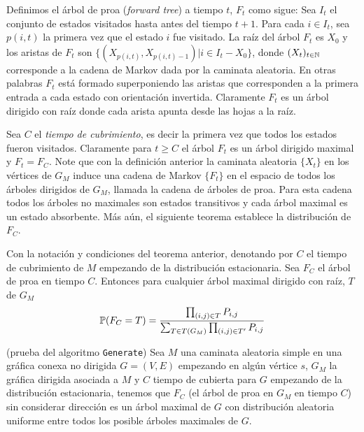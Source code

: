 Definimos el árbol de proa (\textit{forward tree}) a tiempo $t$, $F_{t}$ como sigue: Sea $I_{t}$ el conjunto de estados visitados hasta antes del tiempo $t+1$. Para cada $i\in I_{t}$, sea $p(i,t)$ la primera vez que el estado $i$ fue visitado. La raíz del árbol $F_{t}$ es $X_{0}$ y los aristas de $F_{t}$ son $\{(X_{p(i,t)},X_{p(i,t)-1}) | i\in I_{t}-X_{0}\}$, donde $(X_{t})_{t\in \N}$ corresponde a la cadena de Markov dada por la caminata aleatoria. En otras palabras $F_{t}$ está formado superponiendo las aristas que corresponden a la primera entrada a cada estado con orientación invertida. Claramente $F_{t}$ es un árbol dirigido con raíz donde cada arista apunta desde las hojas a la raíz.

Sea $C$ el \textit{tiempo de cubrimiento}, es decir la primera vez que todos los estados fueron visitados. Claramente para $t\geq C$ el árbol $F_{t}$ es un árbol dirigido maximal y $F_{t}=F_{C}$. Note que con la definición anterior la caminata aleatoria $\{X_{t}\}$ en los vértices de $G_{M}$ induce una cadena de Markov $\{F_{t}\}$ en el espacio de todos los árboles dirigidos de $G_{M}$, llamada la cadena de árboles de proa. Para esta cadena todos los árboles no maximales son estados transitivos y cada árbol maximal es un estado absorbente. Más aún, el siguiente teorema establece la distribución de $F_{C}$.

\begin{theorem}
Con la notación y condiciones del teorema anterior, denotando por $C$ el tiempo de cubrimiento de $M$ empezando de la distribución estacionaria. Sea $F_{C}$ el árbol de proa en tiempo $C$. Entonces para cualquier árbol maximal dirigido con raíz, $T$ de $G_{M}$
$$\P(F_{C} = T) = \frac{\prod_{(i,j)\in T} P_{i,j}}{\sum_{T\in T(G_{M})} \prod_{(i,j)\in T'} P_{i,j}}$$
\end{theorem}

\begin{coro}
(prueba del algoritmo \texttt{Generate}) Sea $M$ una caminata aleatoria simple en una gráfica conexa no dirigida $G = (V, E)$ empezando en algún vértice $s$, $G_{M}$ la gráfica dirigida asociada a $M$ y $C$ tiempo de cubierta para $G$ empezando de la distribución estacionaria, tenemos que $F_{C}$ (el árbol de proa en $G_{M}$ en tiempo $C$) sin considerar dirección es un árbol maximal de $G$ con distribución aleatoria uniforme entre todos los posible árboles maximales de $G$.
\end{coro}

